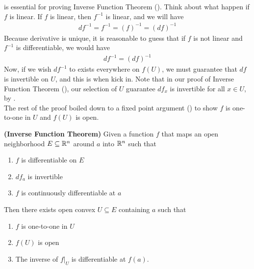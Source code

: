 \documentclass{report}
\begin{document}
\begin{mdframed}
 is essential for proving Inverse Function Theorem (). Think about what happen if $f$ is linear. If $f$ is linear, then $f^{-1}$ is linear, and we will have 
\begin{align*}
df^{-1}=f^{-1}=(f)^{-1}=(df)^{-1}
\end{align*}
Because derivative is unique, it is reasonable to guess that if $f$ is not linear and $f^{-1}$ is differentiable, we would have 
\begin{align*}
df^{-1}=(df)^{-1}
\end{align*}
Now, if we wish $df^{-1}$ to exists everywhere on $f(U)$, we must guarantee that $df$ is invertible on  $U$, and this is when  kick in. Note that in our proof of Inverse Function Theorem (), our selection of $U$ guarantee  $df_x$ is invertible for all $x \in U$, by .\\

The rest of the proof boiled down to a fixed point argument  () to show $f$ is one-to-one in $U$ and $f(U)$ is open. 
\end{mdframed}
\begin{theorem}
\label{IFT}
\textbf{(Inverse Function Theorem)} Given a function $f$ that maps an open neighborhood $E\subseteq \mathbb{R}^n$ around $a$  into $\mathbb{R}^n$ such that 
\begin{enumerate}[label=(\alph*)]
  \item $f$ is differentiable on $E$  
  \item $df_a$ is invertible 
   \item $f$ is continuously differentiable at  $a$
\end{enumerate}
Then there exists open convex $U \subseteq E$ containing $a$ such that
\begin{enumerate}[label=(\alph*)]
  \item $f$ is one-to-one in $U$
   \item $f(U)$ is open 
    \item The inverse of $f|_U$ is differentiable at $f(a)$. 
\end{enumerate}
\end{theorem}
\end{document}

